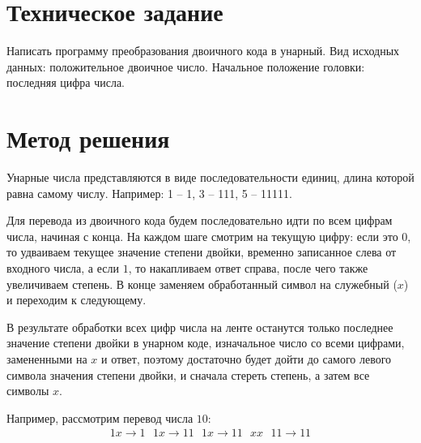 

    
    \newpage
    \renewcommand\contentsname{\centerline{Содержание}}
    \tableofcontents
    \newpage

    \section{Техническое задание}

    Написать программу преобразования двоичного кода в унарный.
    Вид исходных данных: положительное двоичное число.
    Начальное положение головки: последняя цифра числа.

    \section{Метод решения}
    Унарные числа представляются в виде последовательности единиц, длина которой равна самому числу.
    Например: 1 -- 1, 3 -- 111, 5 -- 11111.

    Для перевода из двоичного кода будем последовательно идти по всем цифрам числа, начиная с конца.
    На каждом шаге смотрим на текущую цифру: если это $0$, то удваиваем текущее значение
    степени двойки, временно записанное слева от входного числа, а если $1$, то накапливаем
    ответ справа, после чего также увеличиваем степень.
    В конце заменяем обработанный символ на служебный ($x$) и переходим к следующему.

    В результате обработки всех цифр числа на ленте останутся только последнее значение степени двойки в унарном коде,
    изначальное число со всеми цифрами, замененными на $x$ и ответ, поэтому достаточно будет дойти до самого левого символа
    значения степени двойки, и сначала стереть степень, а затем все символы $x$.

    \vspace{5mm}
    Например, рассмотрим перевод числа $10$:
    \begin{gather*}
        1x \rightarrow 1\text{ }1x \rightarrow 11\text{ }1x \rightarrow 11\text{ }xx\text{ }11 \rightarrow 11\\
    \end{gather*}

